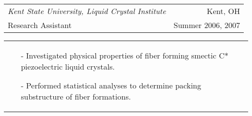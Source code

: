 \begin{tabularx}{\textwidth}{ L R }
  \textit{Kent State University, Liquid Crystal Institute} & Kent, OH \\
  Research Assistant & Summer 2006, 2007 \\
\end{tabularx}
\begin{tabularx}{\textwidth}{ X }
  \begin{small}
  \begin{itemize}
    \itemsep{}
    \item[-] Investigated physical properties of fiber forming smectic C* piezoelectric liquid crystals.
    \item[-] Performed statistical analyses to determine packing substructure of fiber formations.
  \end{itemize}
  \end{small}
\end{tabularx}
